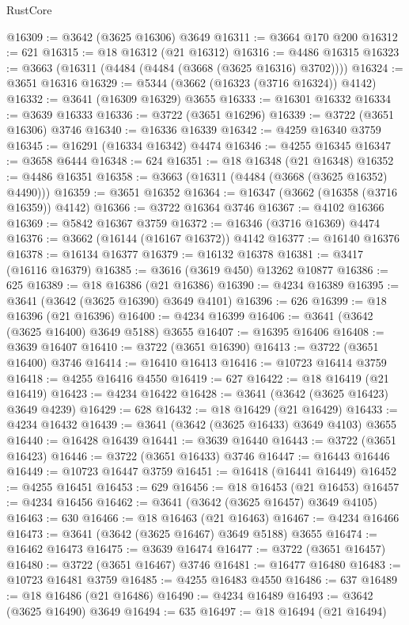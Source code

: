 \begin{lexlean}{RustCore}
\begin{coremodule}
@16309 := @3642 (@3625 @16306) @3649
@16311 := @3664 @170 @200
@16312 := 621
@16315 := @18 @16312 (@21 @16312)
@16316 := @4486 @16315
@16323 := @3663 (@16311 (@4484 (@4484 (@3668 (@3625 @16316) @3702))))
@16324 := @3651 @16316
@16329 := @5344 (@3662 (@16323 (@3716 @16324)) @4142)
@16332 := @3641 (@16309 @16329) @3655
@16333 := @16301 @16332
@16334 := @3639 @16333
@16336 := @3722 (@3651 @16296)
@16339 := @3722 (@3651 @16306) @3746
@16340 := @16336 @16339
@16342 := @4259 @16340 @3759
@16345 := @16291 (@16334 @16342) @4474
@16346 := @4255 @16345
@16347 := @3658 @6444
@16348 := 624
@16351 := @18 @16348 (@21 @16348)
@16352 := @4486 @16351
@16358 := @3663 (@16311 (@4484 (@3668 (@3625 @16352) @4490)))
@16359 := @3651 @16352
@16364 := @16347 (@3662 (@16358 (@3716 @16359)) @4142)
@16366 := @3722 @16364 @3746
@16367 := @4102 @16366
@16369 := @5842 @16367 @3759
@16372 := @16346 (@3716 @16369) @4474
@16376 := @3662 (@16144 (@16167 @16372)) @4142
@16377 := @16140 @16376
@16378 := @16134 @16377
@16379 := @16132 @16378
@16381 := @3417 (@16116 @16379)
@16385 := @3616 (@3619 @450) @13262 @10877
@16386 := 625
@16389 := @18 @16386 (@21 @16386)
@16390 := @4234 @16389
@16395 := @3641 (@3642 (@3625 @16390) @3649 @4101)
@16396 := 626
@16399 := @18 @16396 (@21 @16396)
@16400 := @4234 @16399
@16406 := @3641 (@3642 (@3625 @16400) @3649 @5188) @3655
@16407 := @16395 @16406
@16408 := @3639 @16407
@16410 := @3722 (@3651 @16390)
@16413 := @3722 (@3651 @16400) @3746
@16414 := @16410 @16413
@16416 := @10723 @16414 @3759
@16418 := @4255 @16416 @4550
@16419 := 627
@16422 := @18 @16419 (@21 @16419)
@16423 := @4234 @16422
@16428 := @3641 (@3642 (@3625 @16423) @3649 @4239)
@16429 := 628
@16432 := @18 @16429 (@21 @16429)
@16433 := @4234 @16432
@16439 := @3641 (@3642 (@3625 @16433) @3649 @4103) @3655
@16440 := @16428 @16439
@16441 := @3639 @16440
@16443 := @3722 (@3651 @16423)
@16446 := @3722 (@3651 @16433) @3746
@16447 := @16443 @16446
@16449 := @10723 @16447 @3759
@16451 := @16418 (@16441 @16449)
@16452 := @4255 @16451
@16453 := 629
@16456 := @18 @16453 (@21 @16453)
@16457 := @4234 @16456
@16462 := @3641 (@3642 (@3625 @16457) @3649 @4105)
@16463 := 630
@16466 := @18 @16463 (@21 @16463)
@16467 := @4234 @16466
@16473 := @3641 (@3642 (@3625 @16467) @3649 @5188) @3655
@16474 := @16462 @16473
@16475 := @3639 @16474
@16477 := @3722 (@3651 @16457)
@16480 := @3722 (@3651 @16467) @3746
@16481 := @16477 @16480
@16483 := @10723 @16481 @3759
@16485 := @4255 @16483 @4550
@16486 := 637
@16489 := @18 @16486 (@21 @16486)
@16490 := @4234 @16489
@16493 := @3642 (@3625 @16490) @3649
@16494 := 635
@16497 := @18 @16494 (@21 @16494)

\end{coremodule}
\end{lexlean}
